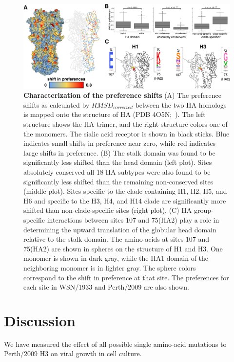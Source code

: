 \documentclass[9pt,twocolumn,twoside]{pnas-new}
\begin{document}
\begin{figure}
\centering
\includegraphics[width=17cm]{figs/RMSD_heatmap/RMSD_heatmap.pdf}
\caption{\label{fig:RMSD_heatmap}
{\bf Characterization of the preference shifts}
(A) The preference shifts as calculated by $\textit{RMSD}_\textit{corrected}$ between the two HA homologs is mapped onto the structure of HA (PDB 4O5N;~\cite{lee2014receptor}). 
The left structure shows the HA trimer, and the right structure colors one of the monomers. 
The sialic acid receptor is shown in black sticks.
Blue indicates small shifts in preference near zero, while red indicates large shifts in preference.
(B) The stalk domain was found to be significantly less shifted than the head domain (left plot).
Sites absolutely conserved all 18 HA subtypes were also found to be significantly less shifted than the remaining non-conserved sites (middle plot).
Sites specific to the clade containing H1, H2, H5, and H6 and specific to the H3, H4, and H14 clade are significantly more shifted than non-clade-specific sites (right plot).
(C) HA group-specific interactions between sites 107 and 75(HA2) play a role in determining the upward translation of the globular head domain relative to the stalk domain.
The amino acids at sites 107 and 75(HA2) are shown in spheres on the structure of H1 and H3. 
One monomer is shown in dark gray, while the HA1 domain of the neighboring monomer is in lighter gray.
The sphere colors correspond to the shift in preference at that site.
The preferences for each site in WSN/1933 and Perth/2009 are also shown.
}
\end{figure}

\section*{Discussion}
\label{sec:discussion}
We have measured the effect of all possible single amino-acid mutations to Perth/2009 H3 on viral growth in cell culture.
\end{document}

